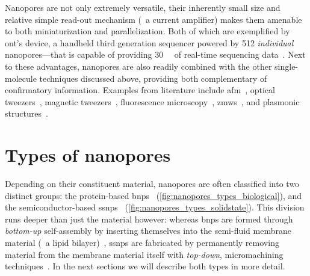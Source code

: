 Nanopores are not only extremely versatile, their inherently small size and relative simple read-out mechanism
(\ie~a current amplifier) makes them amenable to both miniaturization and parallelization. Both of which are
exemplified by \gls{ont}'s  device, a handheld third generation sequencer powered by \num{512}
\emph{individual} nanopores---that is capable of providing \SI{30}{\giga\bp} of real-time sequencing
data~\cite{ONT-2020}. Next to these advantages, nanopores are also readily combined with the other
single-molecule techniques discussed above, providing both complementary of confirmatory information. Examples
from literature include \gls{afm}~\cite{Aramesh-2019}, optical
tweezers~\cite{Keyser-2006,vanDorp-2009,Hall-2009,Galla-2014}, magnetic tweezers~\cite{Peng-2009},
fluorescence microscopy~\cite{McNally-2010,Anderson-2014,Assad-2014,Huang-2015},
\glspl{zmw}~\cite{Auger-2014,Larkin-2017,Spitzberg-2019}, and plasmonic
structures~\cite{Im-2010,Chen-2018,Verschueren-2018,Garoli-2019}.


%
%
\section{Types of nanopores}
%
\label{sec:np:types}
%

Depending on their constituent material, nanopores are often classified into two distinct groups: the
protein-based \glspl{bnp}~\cite{Willems-VanMeervelt-2017} (\cref{fig:nanopores_types_biological}), and the
semiconductor-based \glspl{ssnp}~\cite{Dekker-2007} (\cref{fig:nanopores_types_solidstate}). This division
runs deeper than just the material however: whereas \glspl{bnp} are formed through \emph{bottom-up}
self-assembly by inserting themselves into the semi-fluid membrane material (\eg~a lipid
bilayer)~\cite{Howorka-2017}, \glspl{ssnp} are fabricated by permanently removing material from the membrane
material itself with \emph{top-down}, micromachining techniques~\cite{Dekker-2007}. In the next sections we
will describe both types in more detail.



